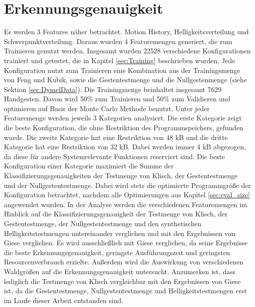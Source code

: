 \section{Erkennungsgenauigkeit}
Es werden 3 Features näher betrachtet. Motion History, Helligkeitsverteilung und Schwerpunktverteilung. Daraus wurden 4 Featuremengen generiert, die zum Trainieren genutzt werden. Insgesamt wurden 22528
verschiedene Konfigurationen trainiert und getestet, die in Kapitel \ref{sec:Training} beschrieben wurden. Jede Konfiguration nutzt zum Trainieren eine Kombination aus der Trainingsmenge von Feng und Kubik,
sowie die Gestentestmenge und die Nullgestenmenge (siehe Sektion \ref{sec:DymelData}). Die Trainingmenge beinhaltet insgesamt 7629 Handgesten. Davon wird 50\% zum Trainieren und 50\% zum Validieren und optimieren
auf Basis der Monte Carlo Methode benutzt.
\newline
\newline
Unter jeder Featuremenge werden jeweils 3 Kategorien analysiert. Die erste Kategorie zeigt die beste Konfiguration, die ohne Restriktion des Programmspeichers, gefunden wurde. Die zweite Kategorie hat eine Restriktion
von 48 kB und die dritte Kategorie hat eine Restriktion von 32 kB. Dabei werden immer 4 kB abgezogen, da diese für andere Systemrelevante Funktionen reserviert sind. Die beste Konfiguration einer Kategorie maximiert die Summe
der Klassifizierungsgenauigkeiten der Testmenge von Klisch, der Gestentestmenge und der Nullgestentestmenge. Dabei wird stets die optimierte Programmgröße der Konfiguration betrachtet, nachdem alle Optimierungen aus Kapitel
\ref{sec:eval_size} angewendet wurden.
\newline
\newline
In der Analyse werden die verschiedenen Featuremengen im Hinblick auf die Klassifizierungsgenauigkeit der Testmenge von Klisch, der Gestentestmenge, der Nullgestentestmenge und den synthetischen
Helligkeitstestmengen untereinander verglichen und mit den Ergebnissen von Giese verglichen. Es wird ausschließlich mit Giese verglichen, da seine Ergebnisse die beste Erkennungsgenauigkeit, geringste Ausführungszeit und
geringsten Resourcenverbrauch erzielte. Außerdem wird die Auswirkung von verschiedenen Waldgrößen auf die Erkennungsgenauigkeit untersucht. Anzumerken ist, dass lediglich die Testmenge von Klisch vergleichbar mit
den Ergebnissen von Giese ist, da die Gestentestmenge, Nullgestentestmenge und Helligkeitstestmengen erst im Laufe dieser Arbeit entstanden sind.







